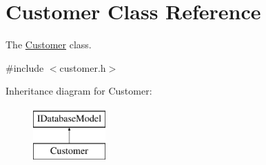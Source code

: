 \hypertarget{classCustomer}{\section{Customer Class Reference}
\label{classCustomer}
}


The \hyperlink{classCustomer}{Customer} class.  




{\ttfamily \#include $<$customer.\-h$>$}

Inheritance diagram for Customer\-:\begin{figure}[H]
\begin{center}
\leavevmode
\includegraphics[height=2.000000cm]{d9/d12/classCustomer}
\end{center}
\end{figure}
